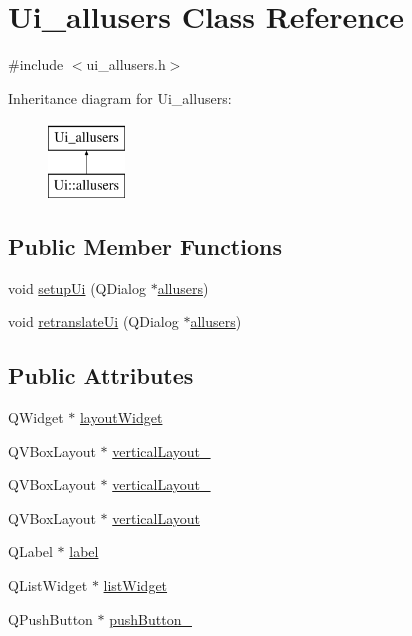 \hypertarget{classUi__allusers}{\section{Ui\-\_\-allusers Class Reference}
\label{classUi__allusers}
}


{\ttfamily \#include $<$ui\-\_\-allusers.\-h$>$}

Inheritance diagram for Ui\-\_\-allusers\-:\begin{figure}[H]
\begin{center}
\leavevmode
\includegraphics[height=2.000000cm]{classUi__allusers}
\end{center}
\end{figure}
\subsection*{Public Member Functions}
\begin{DoxyCompactItemize}
\item 
void \hyperlink{classUi__allusers_ab24fbeef3eccfb87c8f53b06745191b6}{setup\-Ui} (Q\-Dialog $\ast$\hyperlink{classallusers}{allusers})
\item 
void \hyperlink{classUi__allusers_a027d412eb0cf4b8fe7702cd10b522d7a}{retranslate\-Ui} (Q\-Dialog $\ast$\hyperlink{classallusers}{allusers})
\end{DoxyCompactItemize}
\subsection*{Public Attributes}
\begin{DoxyCompactItemize}
\item 
Q\-Widget $\ast$ \hyperlink{classUi__allusers_ab16d5587d6529c6bc5933570609bc503}{layout\-Widget}
\item 
Q\-V\-Box\-Layout $\ast$ \hyperlink{classUi__allusers_ad2a0ec3f0249cd6c6265b7daa7c7e05d}{vertical\-Layout\-\_}
\item 
Q\-V\-Box\-Layout $\ast$ \hyperlink{classUi__allusers_abd56d2c9a46dba1e21f19295a1fb5ed7}{vertical\-Layout\-\_}
\item 
Q\-V\-Box\-Layout $\ast$ \hyperlink{classUi__allusers_afafbf73b9620fdf70831393f9820cf9b}{vertical\-Layout}
\item 
Q\-Label $\ast$ \hyperlink{classUi__allusers_a77698621774f8d4f5ead89152e68c7c5}{label}
\item 
Q\-List\-Widget $\ast$ \hyperlink{classUi__allusers_a19af6dca5907b7aad30005afc80ecd02}{list\-Widget}
\item 
Q\-Push\-Button $\ast$ \hyperlink{classUi__allusers_aa6aaa6433d7716486876f51370000b4b}{push\-Button\-\_}
\end{DoxyCompactItemize}


